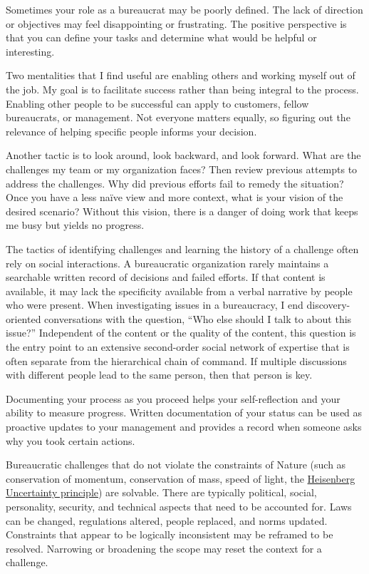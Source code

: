 Sometimes your role as a bureaucrat may be poorly defined. The lack of direction or objectives may feel disappointing or frustrating. The positive perspective is that you can define your tasks and determine what would be helpful or interesting. 

Two mentalities that I find useful are enabling others and working myself out of the job. My goal is to facilitate success rather than being integral to the process. Enabling other people to be successful can apply to customers, fellow bureaucrats, or management. Not everyone matters equally, so figuring out the relevance of helping specific people informs your decision. 

Another tactic is to look around, look backward, and look forward. What are the challenges my team or my organization faces? Then review previous attempts to address the challenges. Why did previous efforts fail to remedy the situation? Once you have a less na\"ive view and more context, what is your vision of the desired scenario? Without this vision, there is a danger of doing work that keeps me busy but yields no progress. 

The tactics of identifying challenges and learning the history of a challenge often rely on social interactions. A bureaucratic organization rarely maintains a searchable written record of decisions and failed efforts. If that content is available, it may lack the specificity available from a verbal narrative by people who were present. When investigating issues in a bureaucracy, I end discovery-oriented conversations with the question, ``Who else should I talk to about this issue?'' Independent of the content or the quality of the content, this question is the entry point to an extensive second-order social network of expertise that is often separate from the hierarchical chain of command. If multiple  discussions with different people lead to the same person, then that person is key. 

Documenting your process as you proceed helps  your self-reflection and your ability to measure progress. Written documentation of your status can be used as proactive updates to your management and provides a record when someone asks  why you took certain actions.

Bureaucratic challenges that do not violate the constraints of Nature (such as conservation of momentum, conservation of mass, speed of light, the \href{https://en.wikipedia.org/wiki/Uncertainty_principle}{Heisenberg Uncertainty principle}) 
are solvable. There are typically political, social, personality, security, and technical aspects that need to be accounted for. Laws can be changed, regulations altered, people replaced, and norms updated. Constraints that appear to be logically inconsistent may be reframed to be resolved. Narrowing or broadening the scope may reset the context for a challenge.



